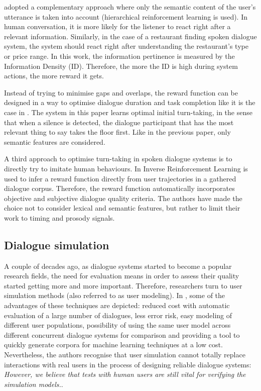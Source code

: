         \cite{Dethlefs2012} adopted a complementary approach where only the semantic content of the user's utterance is taken into account (hierarchical reinforcement learning is used). In human conversation, it is more likely for the listener to react right after a relevant information. Similarly, in the case of a restaurant finding spoken dialogue system, the system should react right after understanding the restaurant's type or price range. In this work, the information pertinence is measured by the Information Density (ID). Therefore, the more the ID is high during system actions, the more reward it gets.
        
        Instead of trying to minimise gaps and overlaps, the reward function can be designed in a way to optimise dialogue duration and task completion like it is the case in \cite{Selfridge2010}. The system in this paper learns optimal initial turn-taking, in the sense that when a silence is detected, the dialogue participant that has the most relevant thing to say takes the floor first. Like in the previous paper, only semantic features are considered.
        
        A third approach to optimise turn-taking in spoken dialogue systems is to directly try to imitate human behaviours. In \cite{Kim2014} Inverse Reinforcement Learning is used to infer a reward function directly from user trajectories in a gathered dialogue corpus. Therefore, the reward function automatically incorporates objective and subjective dialogue quality criteria. The authors have made the choice not to consider lexical and semantic features, but rather to limit their work to timing and prosody signals.
    
    \subsection{Dialogue simulation}
    
    	A couple of decades ago, as dialogue systems started to become a popular research fields, the need for evaluation means in order to assess their quality started getting more and more important. Therefore, researchers turn to user simulation methods (also referred to as user modeling). In \cite{Eckert1997}, some of the advantages of these techniques are depicted: reduced cost with automatic evaluation of a large number of dialogues, less error risk, easy modeling of different user populations, possibility of using the same user model across different concurrent dialogue systems for comparison and providing a tool to quickly generate corpora for machine learning techniques at a low cost. Nevertheless, the authors recognise that user simulation cannot totally replace interactions with real users in the process of designing reliable dialogue systems: \textit{However, we believe that tests with human users are still vital for verifying the simulation models.}.
        
